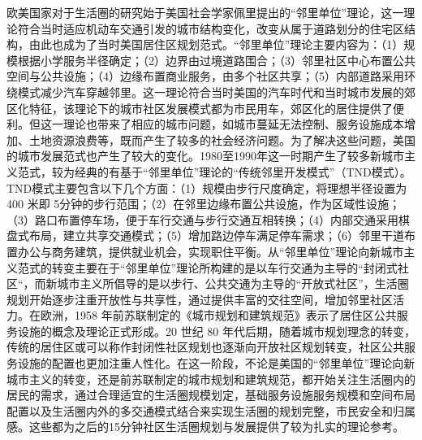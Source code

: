 \documentclass{shnuthesis}
\begin{document}
\indent 欧美国家对于生活圈的研究始于美国社会学家佩里提出的“邻里单位”理论，这一理论符合当时适应机动车交通引发的城市结构变化，改变从属于道路划分的住宅区结构，由此也成为了当时美国居住区规划范式\textsuperscript{\cite{jiang2017}}。“邻里单位”理论主要内容为：（1）规模根据小学服务半径确定；（2）边界由过境道路围合；（3）邻里社区中心布置公共空间与公共设施；（4）边缘布置商业服务，由多个社区共享；（5）内部道路采用环绕模式减少汽车穿越邻里。这一理论符合当时美国的汽车时代和当时城市发展的郊区化特征，该理论下的城市社区发展模式都为市民用车，郊区化的居住提供了便利。但这一理论也带来了相应的城市问题，如城市蔓延无法控制、服务设施成本增加、土地资源浪费等，既而产生了较多的社会经济问题\textsuperscript{\cite{li2006}}。为了解决这些问题，美国的城市发展范式也产生了较大的变化。1980至1990年这一时期产生了较多新城市主义范式，较为经典的有基于“邻里单位”理论的“传统邻里开发模式”（TND模式）。TND模式主要包含以下几个方面：（1）规模由步行尺度确定，将理想半径设置为 400 米即 5分钟的步行范围；（2）在邻里边缘布置公共设施，作为区域性设施；（3）路口布置停车场，便于车行交通与步行交通互相转换；（4）内部交通采用棋盘式布局，建立共享交通模式；（5）增加路边停车满足停车需求；（6）邻里干道布置办公与商务建筑，提供就业机会，实现职住平衡。从“邻里单位”理论向新城市主义范式的转变主要在于“邻里单位”理论所构建的是以车行交通为主导的“封闭式社区“，而新城市主义所倡导的是以步行、公共交通为主导的“开放式社区”，生活圈规划开始逐步注重开放性与共享性，通过提供丰富的交往空间，增加邻里社区活力\textsuperscript{\cite{yang2008a}}。在欧洲，1958 年前苏联制定的《城市规划和建筑规范》表示了居住区公共服务设施的概念及理论正式形成。20 世纪 80 年代后期，随着城市规划理念的转变，传统的居住区或可以称作封闭性社区规划也逐渐向开放社区规划转变，社区公共服务设施的配置也更加注重人性化\textsuperscript{\cite{yuan2015}}。在这一阶段，不论是美国的“邻里单位”理论向新城市主义的转变，还是前苏联制定的城市规划和建筑规范，都开始关注生活圈内的居民的需求，通过合理适宜的生活圈规模划定，基础服务设施服务规模和空间布局配置以及生活圈内外的多交通模式结合来实现生活圈的规划完整，市民安全和归属感。这些都为之后的15分钟社区生活圈规划与发展提供了较为扎实的理论参考。\\
\end{document}
